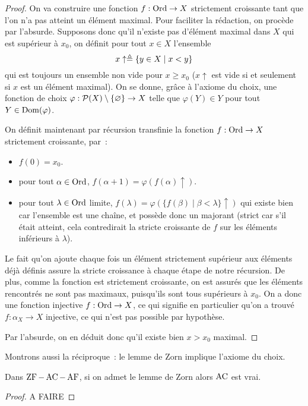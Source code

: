 \begin{proof}
  On va construire une fonction $f : \operatorname{Ord} \to X$ strictement croissante tant que
  l'on n'a pas atteint un élément maximal. Pour faciliter la rédaction, on
  procède par l'absurde. Supposons donc qu'il n'existe pas d'élément maximal
  dans $X$ qui est supérieur à $x_0$, on définit pour tout $x\in X$ l'ensemble
  \[x\uparrow\triangleq \{y \in X \mid x < y\}\]
  qui est toujours un ensemble non vide pour $x \geq x_0$ ($x\uparrow$ est vide
  si et seulement si $x$ est un élément maximal). On se donne, grâce à l'axiome
  du choix, une fonction de choix
  $\varphi : \mathcal{P}(X)\setminus\{\varnothing\}\to X$ telle que
  $\varphi(Y) \in Y$ pour tout $Y\in\operatorname{Dom}(\varphi)$.

  On définit maintenant par récursion transfinie la fonction $f : \operatorname{Ord}\to X$
  strictement croissante, par~:
  \begin{itemize}
  \item $f(0) = x_0$.
  \item pour tout $\alpha\in\operatorname{Ord}$, $f(\alpha+1) = \varphi(f(\alpha)\uparrow)$.
  \item pour tout $\lambda\in\operatorname{Ord}$ limite,
    $f(\lambda) = \varphi(\{f(\beta)\mid \beta < \lambda\}\uparrow)$ qui existe
    bien car l'ensemble est une chaîne, et possède donc un majorant (strict car
    s'il était atteint, cela contredirait la stricte croissante de $f$
    sur les éléments inférieurs à $\lambda$).
  \end{itemize}
  Le fait qu'on ajoute chaque fois un élément strictement supérieur aux éléments
  déjà définis assure la stricte croissance à chaque étape de notre récursion.
  De plus, comme la fonction est strictement croissante, on est assurés que
  les éléments rencontrés ne sont pas maximaux, puisqu'ils sont tous supérieurs
  à $x_0$. On a donc une fonction injective $f : \operatorname{Ord} \to X$, ce qui signifie en
  particulier qu'on a trouvé $f : \alpha_X\to X$ injective, ce qui n'est pas
  possible par hypothèse.

  Par l'absurde, on en déduit donc qu'il existe bien $x > x_0$ maximal.
\end{proof}

Montrons aussi la réciproque~: le lemme de Zorn implique l'axiome du choix.

\begin{proposition}
  Dans $\operatorname{ZF} - \operatorname{AC} - \operatorname{AF}$, si on admet le lemme de Zorn alors $\operatorname{AC}$ est vrai.
\end{proposition}

\begin{proof}
  A FAIRE
\end{proof}

